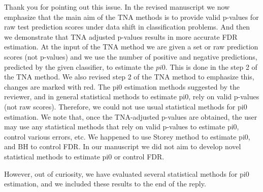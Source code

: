 \documentclass{article}
\newcommand{\response}[1]{\vspace*{1ex} \color{blue} \noindent #1 \color{black}
\vspace*{2ex}}
\begin{document}
\response{Thank you for pointing out this issue. In the revised manuscript we now emphasize that the main aim of the TNA methods is to provide valid p-values for raw test prediction scores under data shift in classification problems. And then we demonstrate that TNA adjusted p-values results in more accurate FDR estimation. At the input of the TNA method we are given a set or raw prediction scores (not p-values) and we use the number of positive and negative predictions, predicted by the given classifier, to estimate the $pi0$. This is done in the step 2 of the TNA method. We also revised step 2 of the TNA method to emphasize this, changes are marked with red. The pi0 estimation methods suggested by the reviewer, and in general statistical methods to estimate pi0, rely on valid p-values (not raw scores). Therefore, we could not use usual statistical methods for pi0 estimation. We note that, once the TNA-adjusted p-values are obtained, the user may use any statistical methods that rely on valid p-values to estimate pi0, control various errors, etc. We happened to use Storey method to estimate pi0, and BH to control FDR. In our manuscript we did not aim to develop novel statistical methods to estimate pi0 or control FDR. 
	
However, out of curiosity, we have evaluated several statistical methods for pi0 estimation, and we included these results to the end of the reply.}


\begin{table}[htbp]
\caption{$\pi_0$ estimation for the TissueNet dataset. Real train proportion: 0.407.}
\label{tab:tissuenet}
\end{table}
\end{document}
